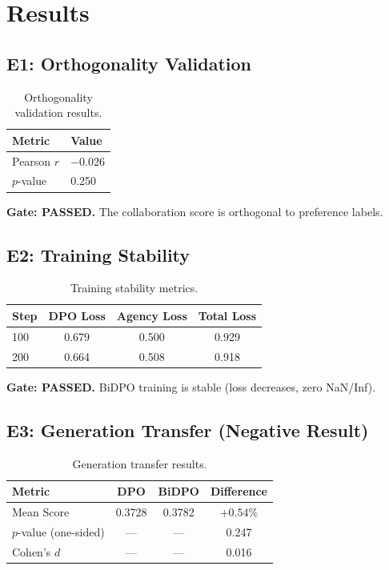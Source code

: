 \section{Results}

\subsection{E1: Orthogonality Validation}

\begin{table}[h]
\centering
\begin{tabular}{ll}
\toprule
\textbf{Metric} & \textbf{Value} \\
\midrule
Pearson $r$ & $-0.026$ \\
$p$-value & 0.250 \\
\bottomrule
\end{tabular}
\caption{Orthogonality validation results.}
\end{table}

\textbf{Gate: PASSED.} The collaboration score is orthogonal to preference labels.

\subsection{E2: Training Stability}

\begin{table}[h]
\centering
\begin{tabular}{lccc}
\toprule
\textbf{Step} & \textbf{DPO Loss} & \textbf{Agency Loss} & \textbf{Total Loss} \\
\midrule
100 & 0.679 & 0.500 & 0.929 \\
200 & 0.664 & 0.508 & 0.918 \\
\bottomrule
\end{tabular}
\caption{Training stability metrics.}
\end{table}

\textbf{Gate: PASSED.} BiDPO training is stable (loss decreases, zero NaN/Inf).

\subsection{E3: Generation Transfer (Negative Result)}

\begin{table}[h]
\centering
\begin{tabular}{lccc}
\toprule
\textbf{Metric} & \textbf{DPO} & \textbf{BiDPO} & \textbf{Difference} \\
\midrule
Mean Score & 0.3728 & 0.3782 & $+0.54\%$ \\
$p$-value (one-sided) & --- & --- & 0.247 \\
Cohen's $d$ & --- & --- & 0.016 \\
\bottomrule
\end{tabular}
\caption{Generation transfer results.}
\end{table}

